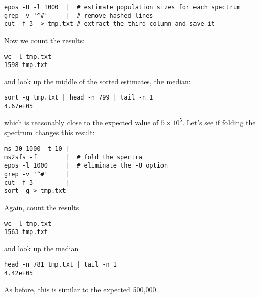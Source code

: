 \documentclass[a4paper, english]{article}
\begin{document}
\begin{itemize}
\begin{verbatim}
epos -U -l 1000  |  # estimate population sizes for each spectrum
grep -v '^#'     |  # remove hashed lines
cut -f 3  > tmp.txt # extract the third column and save it
\end{verbatim}
Now we count the results:
\begin{verbatim}
wc -l tmp.txt 
1598 tmp.txt
\end{verbatim}
and look up the middle of the sorted estimates, the median:
\begin{verbatim}
sort -g tmp.txt | head -n 799 | tail -n 1
4.67e+05
\end{verbatim}
which is reasonably close to the expected value of $5\times
10^5$. 
Let's see if folding the
spectrum changes this result:
\begin{verbatim}
ms 30 1000 -t 10 | 
ms2sfs -f        |  # fold the spectra 
epos -l 1000     |  # eliminate the -U option
grep -v '^#'     |
cut -f 3         |
sort -g > tmp.txt
\end{verbatim}
Again, count the results
\begin{verbatim}
wc -l tmp.txt 
1563 tmp.txt
\end{verbatim}
and look up the median
\begin{verbatim}
head -n 781 tmp.txt | tail -n 1
4.42e+05
\end{verbatim}
As before, this is similar to the expected 500,000. 
\end{itemize}
\end{document}
